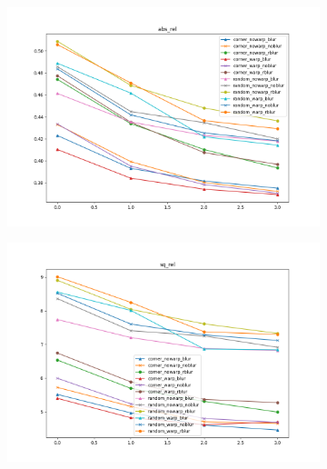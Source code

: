 \begin{figure}
    \begin{adjustwidth}{-0.2\textwidth}{-0.2\textwidth}
    \centering
        \begin{subfigure}{0.6\textwidth}
            \includegraphics[width=\textwidth]{figs/abs_rel}
        \end{subfigure}
        \hspace{0cm}
        \begin{subfigure}{0.6\textwidth}
            \includegraphics[width=\textwidth]{figs/sq_rel}
        \end{subfigure}
        \hspace{0cm}


\end{adjustwidth}
\end{figure}
